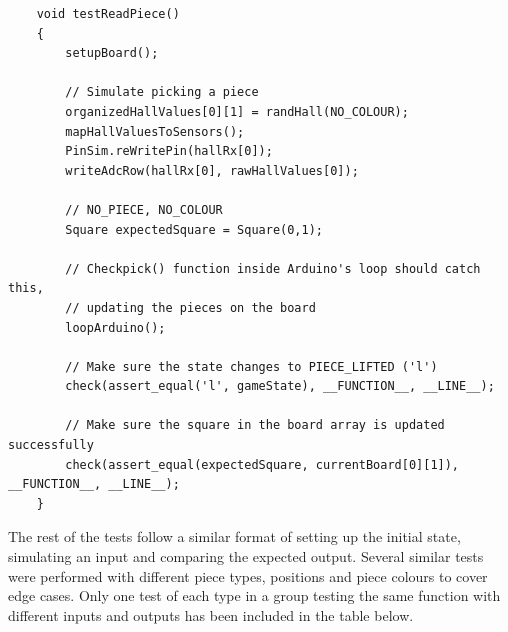 \documentclass[12pt, titlepage]{article}
\begin{document}
\begin{lstlisting}
    void testReadPiece()
    {
        setupBoard(); 
        
        // Simulate picking a piece 
        organizedHallValues[0][1] = randHall(NO_COLOUR);  
        mapHallValuesToSensors(); 
        PinSim.reWritePin(hallRx[0]); 
        writeAdcRow(hallRx[0], rawHallValues[0]); 

        // NO_PIECE, NO_COLOUR 
        Square expectedSquare = Square(0,1);    

        // Checkpick() function inside Arduino's loop should catch this,
        // updating the pieces on the board 
        loopArduino();  

        // Make sure the state changes to PIECE_LIFTED ('l')
        check(assert_equal('l', gameState), __FUNCTION__, __LINE__);  

        // Make sure the square in the board array is updated successfully
        check(assert_equal(expectedSquare, currentBoard[0][1]), __FUNCTION__, __LINE__);  
    }
\end{lstlisting}

  The rest of the tests follow a similar format of setting up the initial state, simulating an input and comparing the expected output. Several similar tests were 
  performed with different piece types, positions and piece colours to cover edge cases. Only one test of each type in a group testing the same function with 
  different inputs and outputs has been included in the table below.
\end{document}
